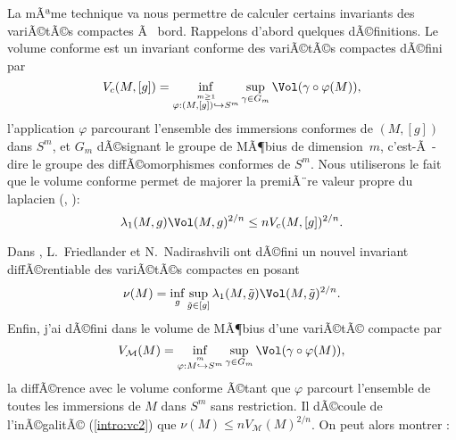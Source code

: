 \documentclass[11pt,a4paper]{smfart}
\begin{document}
 La mÃªme technique va nous permettre de calculer certains invariants des
variÃ©tÃ©s compactes Ã  bord. Rappelons d'abord quelques dÃ©finitions. Le
volume conforme est un invariant conforme des variÃ©tÃ©s compactes
dÃ©fini par
\begin{equation}\label{intro:vc}
V_c(M,[g])=\inf_{\stackrel{m\geq 1}{\varphi:(M,[g])\hookrightarrow S^m}}
\sup_{\gamma\in G_m}\Vol(\gamma\circ\varphi(M)),
\end{equation}
l'application $\varphi$ parcourant l'ensemble des immersions
conformes de $(M,[g])$ dans $S^m$, et $G_m$ dÃ©signant le groupe de MÃ¶bius de
dimension~$m$, c'est-Ã -dire le groupe des diffÃ©omorphismes conformes de $S^m$.
Nous utiliserons le fait que le volume conforme permet de majorer
la premiÃ¨re valeur propre du laplacien (\cite{ly82}, \cite{esi86}):
\begin{equation}\label{intro:vc2}
\lambda_1(M,g)\Vol(M,g)^{2/n}\leq n V_c(M,[g])^{2/n}.
\end{equation}

Dans \cite{fn99}, L.~Friedlander et N.~Nadirashvili ont dÃ©fini un
nouvel invariant diffÃ©rentiable des variÃ©tÃ©s compactes en posant
\begin{equation}\label{intro:nu}
\nu(M)=\inf_g\sup_{\tilde g\in[g]}\lambda_1(M,\tilde g)
\Vol(M,\tilde g)^{2/n}.
\end{equation}
Enfin, j'ai dÃ©fini dans \cite{ja08} le volume de MÃ¶bius d'une variÃ©tÃ© compacte
par
\begin{equation}\label{intro:vm}
V_\mathcal{M}(M)=\inf_{\stackrel{m}{\varphi:M\hookrightarrow S^m}}
\sup_{\gamma\in G_m}\Vol(\gamma\circ\varphi(M)),
\end{equation}
la diffÃ©rence avec le volume conforme Ã©tant que $\varphi$ parcourt
l'ensemble de toutes les immersions de $M$ dans $S^m$ sans restriction.
Il dÃ©coule de l'inÃ©galitÃ© (\ref{intro:vc2}) que $\nu(M)\leq
nV_\mathcal{M}(M)^{2/n}$. On peut alors montrer :
\end{document}
